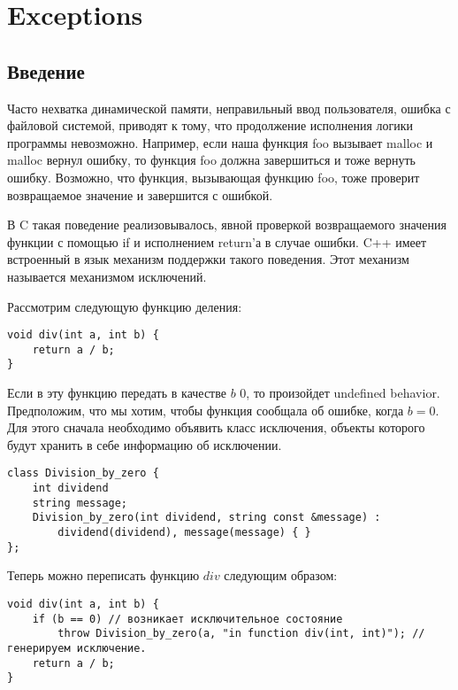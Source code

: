 \section{Exceptions}
\subsection{Введение}
Часто нехватка динамической памяти, неправильный ввод пользователя, ошибка с файловой системой, приводят к тому, что продолжение исполнения логики программы невозможно. Например, если наша функция foo вызывает malloc и malloc вернул ошибку, то функция foo должна завершиться и тоже вернуть ошибку. Возможно, что функция, вызывающая функцию foo, тоже проверит возвращаемое значение и завершится с ошибкой.

В C такая поведение реализовывалось, явной проверкой возвращаемого значения функции с помощью if и исполнением return'а в случае ошибки. C++ имеет встроенный в язык механизм поддержки такого поведения. Этот механизм называется механизмом исключений.

Рассмотрим следующую функцию деления:
\begin{verbatim}
void div(int a, int b) {
    return a / b;
}
\end{verbatim}

Если в эту функцию передать в качестве $b$ $0$, то произойдет undefined behavior. Предположим, что мы хотим, чтобы функция сообщала об ошибке, когда $b = 0$. Для этого сначала необходимо объявить класс исключения, объекты которого будут хранить в себе информацию об исключении.

\begin{verbatim}
class Division_by_zero {
    int dividend
    string message;
    Division_by_zero(int dividend, string const &message) :
        dividend(dividend), message(message) { }
};
\end{verbatim}

Теперь можно переписать функцию $div$ следующим образом:

\begin{verbatim}
void div(int a, int b) {
    if (b == 0) // возникает исключительное состояние
        throw Division_by_zero(a, "in function div(int, int)"); // генерируем исключение.
    return a / b;
}
\end{verbatim}

